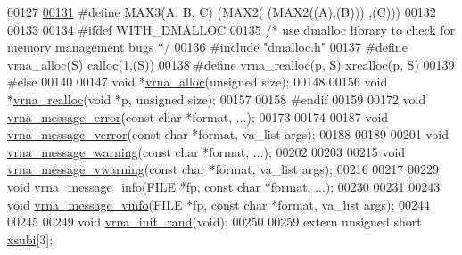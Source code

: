 \begin{DoxyCode}
00127 
\hypertarget{utils_8h_source.tex_l00131}{}\hyperlink{group__utils_ga27c2f8e6ef48853a348897da2ef8e7f8}{00131} \textcolor{preprocessor}{#define MAX3(A, B, C)   (MAX2(  (MAX2((A),(B))) ,(C)))}
00132 
00133 
00134 \textcolor{preprocessor}{#ifdef WITH\_DMALLOC}
00135 \textcolor{comment}{/* use dmalloc library to check for memory management bugs */}
00136 \textcolor{preprocessor}{#include "dmalloc.h"}
00137 \textcolor{preprocessor}{#define vrna\_alloc(S)       calloc(1,(S))}
00138 \textcolor{preprocessor}{#define vrna\_realloc(p, S)  xrealloc(p, S)}
00139 \textcolor{preprocessor}{#else}
00140 
00147 \textcolor{keywordtype}{void}  *\hyperlink{group__utils_gaf37a0979367c977edfb9da6614eebe99}{vrna\_alloc}(\textcolor{keywordtype}{unsigned} size);
00148 
00156 \textcolor{keywordtype}{void}  *\hyperlink{group__utils_ga27f4719a66c6f90d1cca3d1e6e696c6a}{vrna\_realloc}(\textcolor{keywordtype}{void} *p, \textcolor{keywordtype}{unsigned} size);
00157 
00158 \textcolor{preprocessor}{#endif}
00159 
00172 \textcolor{keywordtype}{void} \hyperlink{group__utils_ga36b35be01d7f36cf7f59c245eee628d1}{vrna\_message\_error}(\textcolor{keyword}{const} \textcolor{keywordtype}{char} *format, ...);
00173 
00174 
00187 \textcolor{keywordtype}{void} \hyperlink{group__utils_gabc1a08dea0d84b5c33701732172a8b18}{vrna\_message\_verror}(\textcolor{keyword}{const} \textcolor{keywordtype}{char} *format, va\_list args);
00188 
00189 
00201 \textcolor{keywordtype}{void} \hyperlink{group__utils_ga6e07ed24add60693ba886d54d0a46635}{vrna\_message\_warning}(\textcolor{keyword}{const} \textcolor{keywordtype}{char} *format, ...);
00202 
00203 
00215 \textcolor{keywordtype}{void} \hyperlink{group__utils_ga377aa8ec8a49d343063adb22e6311f26}{vrna\_message\_vwarning}(\textcolor{keyword}{const} \textcolor{keywordtype}{char} *format, va\_list args);
00216 
00217 
00229 \textcolor{keywordtype}{void} \hyperlink{group__utils_ga039bae6153a6415b054dbe6045f83d03}{vrna\_message\_info}(FILE *fp, \textcolor{keyword}{const} \textcolor{keywordtype}{char} *format, ...);
00230 
00231 
00243 \textcolor{keywordtype}{void} \hyperlink{group__utils_gad8b8139bd04fbfb51e398e9fcd6908dc}{vrna\_message\_vinfo}(FILE *fp, \textcolor{keyword}{const} \textcolor{keywordtype}{char} *format, va\_list args);
00244 
00245 
00249 \textcolor{keywordtype}{void} \hyperlink{group__utils_ga0ad1f40ea316e5c5918695c35613027a}{vrna\_init\_rand}(\textcolor{keywordtype}{void});
00250 
00259 \textcolor{keyword}{extern} \textcolor{keywordtype}{unsigned} \textcolor{keywordtype}{short} \hyperlink{group__utils_gaf9a866c8417afda7368bbac939ab3c47}{xsubi}[3];

\end{DoxyCode}
